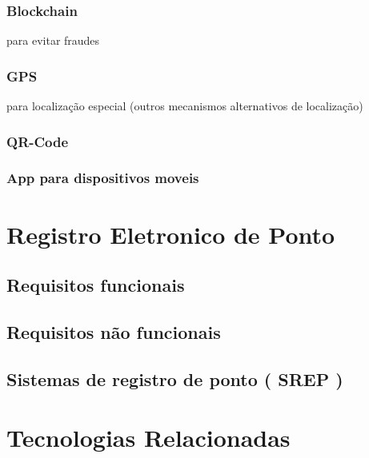 \documentclass[12pt,openright,twoside,a4paper,english, brazil]{abntex2} %
\begin{document}
\subsection{Blockchain}
para evitar fraudes
\subsection{GPS}
para localização especial (outros mecanismos alternativos de localização)
\subsection{QR-Code}
\subsection{App para dispositivos moveis}









\chapter{Registro Eletronico de Ponto}




\section{Requisitos funcionais}

\section{Requisitos não funcionais}

\section{Sistemas de registro de ponto ( SREP )}








\chapter{Tecnologias Relacionadas}
\end{document}
